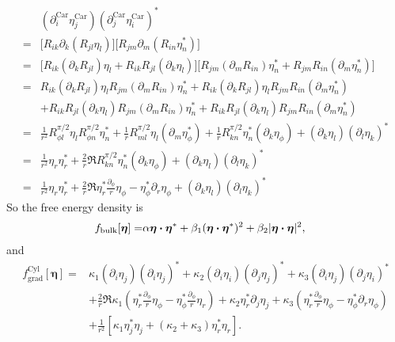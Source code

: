 \documentclass[aps,prl,preprint]{revtex4-2}
\begin{document}
\begin{align}
    &(\partial_i^{\text{Car}}\eta_j^{\text{Car}})(\partial_j^{\text{Car}}\eta_i^{\text{Car}})^*\\
    =&\bigg[R_{ik}\partial_k(R_{jl}\eta_l)\bigg]\bigg[R_{jm}\partial_m(R_{in}\eta_n^*)\bigg]\\
    =&\bigg[R_{ik}(\partial_k R_{jl})\eta_l + R_{ik}R_{jl}(\partial_k\eta_l)\bigg]
    \bigg[R_{jm}(\partial_m R_{in})\eta_n^* + R_{jm}R_{in}(\partial_m\eta_n^*)\bigg]\\
    =&R_{ik}(\partial_k R_{jl})\eta_l R_{jm}(\partial_m R_{in})\eta_n^*
    + R_{ik}(\partial_k R_{jl})\eta_l R_{jm}R_{in}(\partial_m\eta_n^*)\nonumber\\
    &+ R_{ik}R_{jl}(\partial_k\eta_l) R_{jm}(\partial_m R_{in})\eta_n^*
    + R_{ik}R_{jl}(\partial_k\eta_l) R_{jm}R_{in}(\partial_m\eta_n^*)\\
    =&\frac{1}{r^2}R^{\pi/2}_{\phi l}\eta_l R^{\pi/2}_{\phi n}\eta_n^*
    +\frac{1}{r}R^{\pi/2}_{ml}\eta_l(\partial_m\eta_\phi^*)
    +\frac{1}{r}R^{\pi/2}_{kn}\eta_n^*(\partial_k\eta_\phi)
    +(\partial_k\eta_l)(\partial_l \eta_k)^*\\
    =&\frac{1}{r^2}\eta_r\eta_r^* + \frac{2}{r}\Re{R^{\pi/2}_{kn}\eta_n^*(\partial_k\eta_\phi)}
    + (\partial_k\eta_l)(\partial_l \eta_k)^*\\
    =&\frac{1}{r^2}\eta_r\eta_r^* + \frac{2}{r}\Re{\eta_r^*\frac{\partial_\phi}{r}\eta_\phi - \eta_\phi^*\partial_r\eta_\phi}
    + (\partial_k\eta_l)(\partial_l \eta_k)^*
\end{align}
So the free energy density is
\begin{align}
    f_{\text{bulk}}[\bm{\eta}]=&\alpha\bm{\eta}\vdot\bm{\eta}^*
    +\beta_1(\bm{\eta}\vdot\bm{\eta}^*)^2
    +\beta_2|\bm{\eta}\vdot\bm{\eta}|^2,
\end{align}
and
\begin{align}
    f^{\text{Cyl}}_{\text{grad}}[\bm{\eta}]=&\kappa_1(\partial_i\eta_j)(\partial_i\eta_j)^*
    +\kappa_2(\partial_i\eta_i)(\partial_j\eta_j)^*
    +\kappa_3(\partial_i\eta_j)(\partial_j\eta_i)^*\nonumber\\
    &+\frac{2}{r}\Re{
    \kappa_1\left(\eta_r^*\frac{\partial_\phi}{r}\eta_\phi
    -\eta_\phi^*\frac{\partial_\phi}{r}\eta_r\right)
    +\kappa_2\eta_r^*\partial_j\eta_j
    +\kappa_3\left(\eta_r^*\frac{\partial_\phi}{r}\eta_\phi
    -\eta_\phi^*\partial_r\eta_\phi\right)}\nonumber\\
    &+\frac{1}{r^2}\left[\kappa_1\eta^*_j\eta_j
    +(\kappa_2+\kappa_3)\eta_r^*\eta_r\right].\label{fgrad}
\end{align}
\end{document}
